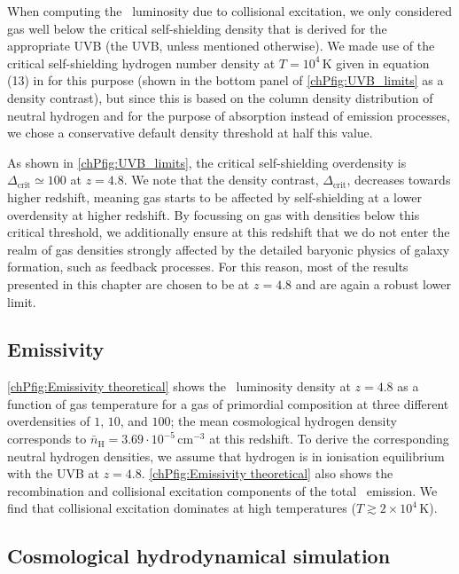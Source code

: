 When computing the \lya\ luminosity due to collisional excitation, we only considered gas well below the critical self-shielding density that is derived for the appropriate UVB (the  UVB, unless mentioned otherwise). We made use of the critical self-shielding hydrogen number density at $T = 10^4 \, \mathrm{K}$ given in equation (13) in \citet{2013MNRAS.430.2427R} for this purpose (shown in the bottom panel of \cref{chPfig:UVB_limits} as a density contrast), but since this is based on the column density distribution of neutral hydrogen and for the purpose of absorption instead of emission processes, we chose a conservative default density threshold at half this value.

As shown in \cref{chPfig:UVB_limits}, the critical self-shielding overdensity is $\Delta_\text{crit} \simeq 100$ at $z=4.8$. We note that the density contrast, $\Delta_\text{crit}$, decreases towards higher redshift, meaning gas starts to be affected by self-shielding at a lower overdensity at higher redshift. By focussing on gas with densities below this critical threshold, we additionally ensure at this redshift that we do not enter the realm of gas densities strongly affected by the detailed baryonic physics of galaxy formation, such as feedback processes. For this reason, most of the results presented in this chapter are chosen to be at $z=4.8$ and are again a robust lower limit.

\subsection{Emissivity}
\label{chPssec:Emissivity}

\cref{chPfig:Emissivity theoretical} shows the \lya\ luminosity density at $z=4.8$ as a function of gas temperature for a gas of primordial composition at three different overdensities of $1$, $10$, and $100$; the mean cosmological hydrogen density corresponds to $\bar{n}_\text{H} = 3.69 \cdot 10^{-5} \, \mathrm{cm^{-3}}$ at this redshift. To derive the corresponding neutral hydrogen densities, we assume that hydrogen is in ionisation equilibrium with the  UVB at $z=4.8$. \cref{chPfig:Emissivity theoretical} also shows the recombination and collisional excitation components of the total \lya\ emission. We find that collisional excitation dominates at high temperatures ($T \gtrsim 2 \times 10^4 \, \mathrm{K}$).

\subsection{Cosmological hydrodynamical simulation}
\label{chPssec:SherwoodSuite}

